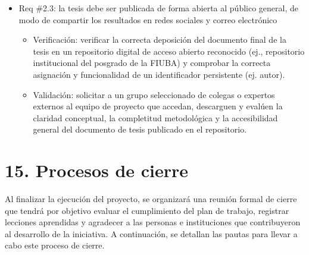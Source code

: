 \documentclass[
11pt, %
]{charter}
\begin{document}
\begin{itemize}
    \item Req \#2.3: la tesis debe ser publicada de forma abierta al público general, de modo de compartir los resultados en redes sociales y correo electrónico
    \begin{itemize}
        \item Verificación: verificar la correcta deposición del documento final de la tesis en un repositorio digital de acceso abierto reconocido (ej., repositorio institucional del posgrado de la FIUBA) y comprobar la correcta asignación y funcionalidad de un identificador persistente (ej. autor).
        \item Validación: solicitar a un grupo seleccionado de colegas o expertos externos al equipo de proyecto que accedan, descarguen y evalúen la claridad conceptual, la completitud metodológica y la accesibilidad general del documento de tesis publicado en el repositorio.
    \end{itemize}
\end{itemize}


\section{15. Procesos de cierre}    
\label{sec:cierre}

Al finalizar la ejecución del proyecto, se organizará una reunión formal de cierre que tendrá por objetivo evaluar el cumplimiento del plan de trabajo, registrar lecciones aprendidas y agradecer a las personas e instituciones que contribuyeron al desarrollo de la iniciativa. A continuación, se detallan las pautas para llevar a cabo este proceso de cierre.
\end{document}
